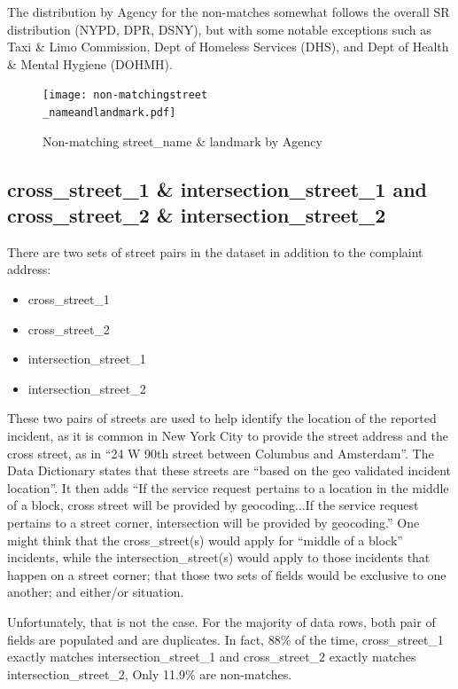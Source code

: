 \documentclass[12pt, titlepage]{article}
\begin{document}
{The distribution by Agency for the non-matches somewhat follows the overall SR distribution (NYPD, DPR, DSNY), 
but with some notable exceptions such as Taxi \& Limo Commission, Dept of Homeless Services (DHS),
 and Dept of Health \& Mental Hygiene (DOHMH).

\begin{figure}[tbp]
		\centering
		\texttt{[image: non-matchingstreet\\\_nameandlandmark.pdf]}
		\caption{Non-matching street\_name \& landmark by Agency}
		\label{fig:landmarkchart}
	\end{figure}	
	
	
\subsection{cross\_street\_1 \& intersection\_street\_1 and cross\_street\_2 \& intersection\_street\_2}
There are two sets of street pairs in the dataset in addition to the complaint address:

	\begin{itemize}
		\item cross\_street\_1
		\item cross\_street\_2
		\item intersection\_street\_1
		\item intersection\_street\_2
	\end{itemize}
	
These two pairs of streets are used to help identify the location of the reported incident, as it is common in
New York City to provide the street address and the cross street, as in ``24 W 90th street between Columbus and
Amsterdam''. The Data Dictionary states that these streets are
 ``based on the geo validated incident location''. It then adds ``If the service request 
pertains to a location in the middle of a block, cross street will be provided by geocoding...If the service request 
pertains to a street corner, intersection will be provided by geocoding.''  One might think that the
cross\_street(s) would apply for ``middle of a block'' incidents, while the intersection\_street(s) would
apply to those incidents that happen on a street corner; that those two sets of fields would be
exclusive to one another; and either/or situation. 

Unfortunately, that is not the case. For the majority of data rows, both pair of fields are populated and are duplicates.
In fact, 88\% of the time, cross\_street\_1 exactly matches intersection\_street\_1 and 
cross\_street\_2 exactly matches intersection\_street\_2, Only 11.9\% are non-matches.

}
\end{document}
